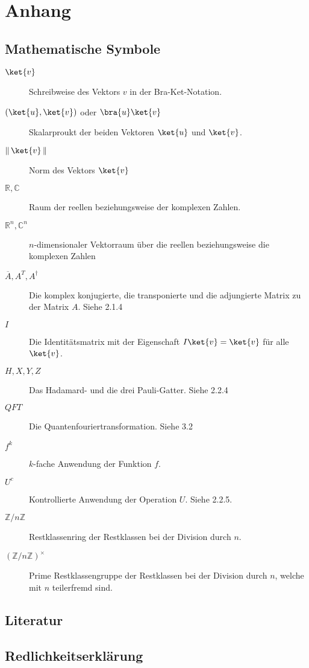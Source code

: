 \chapter{Anhang}
\section{Mathematische Symbole}
\begin{description}
    \item[$\ket{v}$] Schreibweise des Vektors $v$ in der Bra-Ket-Notation.
    \item[$(\ket{u}, \ket{v})$ oder $\bra{u}\ket{v}$] Skalarproukt der beiden Vektoren $\ket{u}$ und $\ket{v}$.
    \item[$\left\|\, \ket{v}\, \right\|$] Norm des Vektors $\ket{v}$
    \item[$\mathbb{R}, \mathbb{C}$] Raum der reellen beziehungsweise der komplexen Zahlen.
    \item[$\mathbb{R}^n, \mathbb{C}^n$] $n$-dimensionaler Vektorraum über die reellen beziehungsweise die komplexen Zahlen
    \item[$\overline{A}, A^T, A^\dagger$] Die komplex konjugierte, die transponierte und die adjungierte Matrix zu der Matrix $A$. Siehe 2.1.4
    \item[$I$] Die Identitätsmatrix mit der Eigenschaft $I\ket{v} = \ket{v}$ für alle $\ket{v}$. 
    \item[$H, X, Y, Z$] Das Hadamard- und die drei Pauli-Gatter. Siehe 2.2.4
    \item[$QFT$] Die Quantenfouriertransformation. Siehe 3.2
    \item[$f^k$] $k$-fache Anwendung der Funktion $f$.
    \item[$U^c$] Kontrollierte Anwendung der Operation $U$. Siehe 2.2.5.
    \item[$\mathbb{Z} / n \mathbb{Z}$] Restklassenring der Restklassen bei der Division durch $n$. 
    \item[$(\mathbb {Z}/n\mathbb {Z} )^{\times}$] Prime Restklassengruppe der Restklassen bei der Division durch $n$, welche mit $n$ teilerfremd sind.
\end{description}

\section{Literatur}
\printbibliography

\section{Redlichkeitserklärung}
